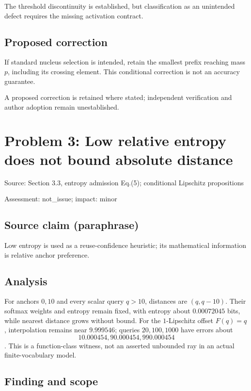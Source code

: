 \documentclass[11pt]{article}
\begin{document}
The threshold discontinuity is established, but classification as an unintended defect requires the missing activation contract.

\subsection*{Proposed correction}

If standard nucleus selection is intended, retain the smallest prefix reaching mass \(p\), including its crossing element. This conditional correction is not an accuracy guarantee.

A proposed correction is retained where stated; independent verification and author adoption remain unestablished.

\section*{Problem 3: Low relative entropy does not bound absolute distance}

Source: Section 3.3, entropy admission Eq.(5); conditional Lipschitz propositions

Assessment: not\_issue; impact: minor

\subsection*{Source claim (paraphrase)}

Low entropy is used as a reuse-confidence heuristic; its mathematical information is relative anchor preference.

\subsection*{Analysis}

For anchors \(0,10\) and every scalar query \(q>10\), distances are \((q,q-10)\). Their softmax weights and entropy remain fixed, with entropy about \(0.00072045\) bits, while nearest distance grows without bound. For the \(1\)-Lipschitz offset \(F(q)=q\), interpolation remains near \(9.999546\); queries \(20,100,1000\) have errors about \[10.000454,90.000454,990.000454\]. This is a function-class witness, not an asserted unbounded ray in an actual finite-vocabulary model.

\subsection*{Finding and scope}
\end{document}

